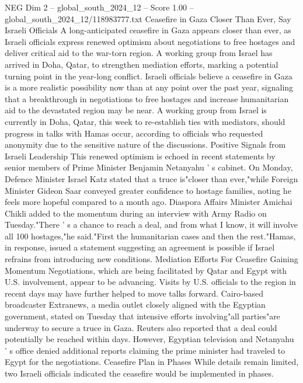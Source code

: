 \begin{textsample}{NEG Dim 2 – global\_south\_2024\_12 – Score 1.00 – global\_south\_2024\_12/118983777.txt}  \label{ex:f2_neg_242}
Ceasefire in Gaza Closer Than Ever, Say Israeli Officials A long-anticipated ceasefire in Gaza appears closer than ever, as Israeli officials express renewed optimism about negotiations to free hostages and deliver critical aid to the war-torn region.
A working group from Israel has arrived in Doha, Qatar, to strengthen mediation efforts, marking a potential turning point in the year-long conflict.
Israeli officials believe a ceasefire in Gaza is a more realistic possibility now than at any point over the past year, signaling that a breakthrough in negotiations to free hostages and increase humanitarian aid to the devastated region may be near.
A working group from Israel is currently in Doha, Qatar, this week to re-establish ties with mediators, should progress in talks with Hamas occur, according to officials who requested anonymity due to the sensitive nature of the discussions.
Positive Signals from Israeli Leadership This renewed optimism is echoed in recent statements by senior members of Prime Minister Benjamin Netanyahu ' s cabinet.
On Monday, Defence Minister Israel Katz stated that a truce is"closer than ever,"while Foreign Minister Gideon Saar conveyed greater confidence to hostage families, noting he feels more hopeful compared to a month ago.
Diaspora Affairs Minister Amichai Chikli added to the momentum during an interview with Army Radio on Tuesday."There ' s a chance to reach a deal, and from what I know, it will involve all 100 hostages,"he said."First the humanitarian cases and then the rest."Hamas, in response, issued a statement suggesting an agreement is possible if Israel refrains from introducing new conditions.
Mediation Efforts For Ceasefire Gaining Momentum Negotiations, which are being facilitated by Qatar and Egypt with U.S. involvement, appear to be advancing.
Visits by U.S. officials to the region in recent days may have further helped to move talks forward.
Cairo-based broadcaster Extranews, a media outlet closely aligned with the Egyptian government, stated on Tuesday that intensive efforts involving"all parties"are underway to secure a truce in Gaza.
Reuters also reported that a deal could potentially be reached within days.
However, Egyptian television and Netanyahu ' s office denied additional reports claiming the prime minister had traveled to Egypt for the negotiations.
Ceasefire Plan in Phases While details remain limited, two Israeli officials indicated the ceasefire would be implemented in phases.

\end{textsample}
